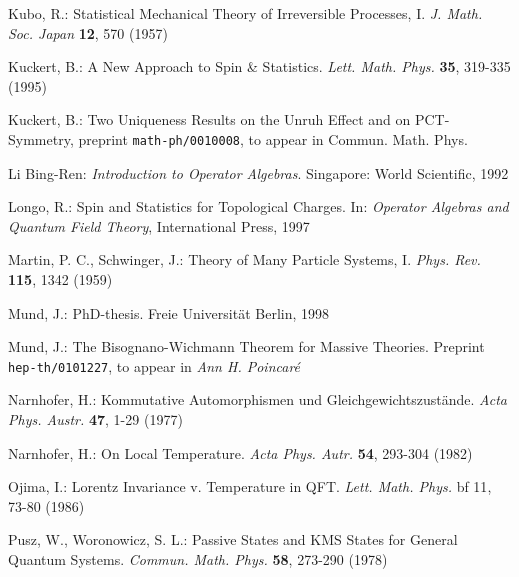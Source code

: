 \documentclass[a4paper,11pt]{article}
\begin{document}
\begin{thebibliography}{*****}
 Kubo, R.: Statistical Mechanical Theory of Irreversible
Processes, I. {\it J. Math. Soc. Japan} {\bf 12}, 570 (1957)

 Kuckert, B.: A New Approach to Spin \& Statistics.
{\it Lett. Math. Phys.} {\bf 35}, 319-335 (1995)

 Kuckert, B.: Two Uniqueness Results on the Unruh Effect and on
PCT-Symmetry, preprint {\tt math-ph/0010008}, to appear in Commun. Math. Phys.

 Li Bing-Ren: {\it Introduction to Operator Algebras}.
Singapore: World Scientific, 1992


 Longo, R.: Spin and Statistics for Topological Charges.
In: {\it Operator Algebras and Quantum Field Theory}, International Press, 1997

 Martin, P. C., Schwinger, J.: Theory of
Many Particle Systems, I. {\it Phys. Rev.} {\bf 115}, 1342 (1959)


 Mund, J.: PhD-thesis. Freie Universit\"at Berlin, 1998

 Mund, J.: The Bisognano-Wichmann Theorem for Massive
Theories. Preprint {\tt hep-th/0101227}, to appear in {\it Ann H. Poincar\'e}

 Narnhofer, H.: Kommutative Automorphismen und
Gleichge\-wichts\-zust\"ande. {\it Acta Phys. Austr.} {\bf 47}, 1-29 (1977)

 Narnhofer, H.: On Local Temperature. {\it Acta Phys. Autr.} {\bf 54},
293-304 (1982)

 Ojima, I.: Lorentz Invariance v. Temperature in
QFT. {\it Lett. Math. Phys.} {bf 11}, 73-80 (1986)




 Pusz, W., Woronowicz, S. L.: Passive States and KMS States for
General Quantum Systems. {\it Commun. Math. Phys.} {\bf 58}, 273-290 (1978)


\end{thebibliography}
\end{document}
